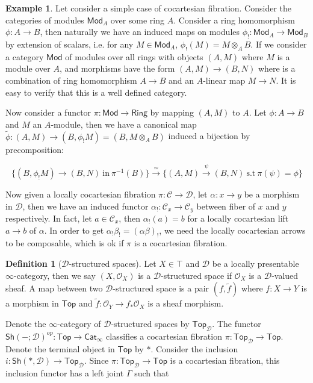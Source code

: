 \documentclass[11pt]{amsart}
\numberwithin{equation}{section}
\theoremstyle{definition}
\newtheorem{example}[thm]{Example}
\newtheorem{defn}[thm]{Definition}
\theoremstyle{remark}
\numberwithin{equation}{section}
\newcommand{\CO}{{\mathcal O}}
\newcommand{\sh}{\mathsf{Sh}}
\newcommand{\Mod}{\mathsf{Mod}}
\newcommand{\cat}{\mathsf{Cat}}
\newcommand{\ring}{\mathsf{Ring}}
\newcommand{\Top}{\mathsf{Top}}
\begin{document}
\begin{example}
	Let consider a simple case of cocartesian fibration. Consider the categories of modules $\Mod_A$ over some ring $A$. Consider a ring homomorphism $\phi: A\to B$, then naturally we have an induced maps on modules $\phi_!: \Mod_A \to \Mod_B$ by extension of scalars, i.e. for any $M\in \Mod_A$, $\phi_!(M)= M\otimes_A B$. If we consider a category $\Mod$ of modules over all rings with objects $(A,M)$ where $M$ is a module over $A$, and morphisms have the form $(A,M) \to (B,N)$ where is a combination of ring homomorphism $A \to B$ and an $A$-linear map $M\to N$. It is easy to verify that this is a well defined category. 
	
	Now consider a functor $\pi: \Mod\to \ring$ by mapping $(A,M)$ to $A$. Let $\phi: A\to B$ and $M$ an $A$-module, then we have a canonical map $\tilde{\phi}:(A,M)\to (B, \phi_!M)=(B, M\otimes_A B)$ induced a bijection by precomposition:
	
	\begin{equation*}
	\{(B,\phi_! M) \to (B,N)\ \text{in}\ \pi^{-1}(B)  \}\stackrel{\simeq}{\longrightarrow} \{(A,M)\stackrel{\psi}{\longrightarrow} (B,N)            \ \text{s.t}\ \pi(\psi)=\phi \}
	\end{equation*}
\end{example}

Now given a locally cocartesian fibration $\pi: \mathscr{C}\to \mathscr{D}$, let $\alpha: x\to y$ be a morphism in $\mathscr{D}$, then we have an induced functor $\alpha_! : \mathscr{C}_x \to \mathscr{C}_y$ between fiber of $x$ and $y$ respectively. In fact, let $a\in \mathscr{C}_x$, then $\alpha_!(a)=b$ for a locally cocartesian lift $a\to b$ of $\alpha$. In order to get $\alpha_!\beta_!= (\alpha\beta)_!$, we need the locally cocartesian arrows to be composable, which is ok if $\pi$ is a cocartesian fibration.

\begin{defn}[$\mathscr{D}$-structured spaces]
	Let $X\in \top$ and $\mathscr{D}$ be a locally presentable $\infty$-category, then we say $(X,\CO_X)$ is a $\mathscr{D}$-structured space if $\CO_X$ is a $\mathscr{D}$-valued sheaf. A map between two $\mathscr{D}$-structured space is a pair $(f, \tilde{f})$ where $f:X\to Y$ is a morphism in $\Top$ and $\tilde{f}: \CO_Y \to f_{*}\CO_X$ is a sheaf morphism. 
\end{defn}

Denote the $\infty$-category of $\mathscr{D}$-structured spaces by $\Top_{\mathscr{D}}$. The functor $\sh(-;\mathscr{D})^{op}: \Top\to \cat_{\infty}$ classifies a cocartesian fibration $\pi : \Top_{\mathscr{D}}\to \Top$. Denote the terminal object in $\Top$ by $*$. Consider the inclusion $i: \sh(*, \mathscr{D})\to \Top_{\mathscr{D}}$. Since $\pi: \Top_{\mathscr{D}}\to \Top$ is a cocartesian fibration, this inclusion functor has a left joint $\Gamma$ such that
\end{document}
